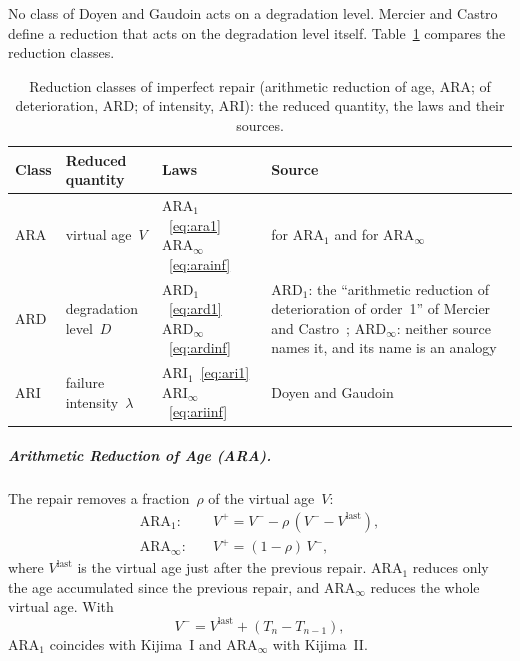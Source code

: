 \documentclass[11pt,a4paper]{article}
\theoremstyle{plain}
\theoremstyle{definition}
\theoremstyle{remark}
\begin{document}
No class of Doyen and Gaudoin acts on a degradation level.
Mercier and Castro~\cite{MercierCastro2019} define a reduction that acts on the degradation level itself.
Table~\ref{tab:reduction_classes} compares the reduction classes.

\begin{table}[htbp]
\centering
\caption{Reduction classes of imperfect repair (arithmetic reduction of age, ARA; of deterioration, ARD; of intensity, ARI): the reduced quantity, the laws and their sources.}
\label{tab:reduction_classes}
\small
\begin{tabularx}{\linewidth}{@{}>{\hsize=0.343\hsize\raggedright\arraybackslash}X>{\hsize=0.943\hsize\raggedright\arraybackslash}X>{\hsize=0.743\hsize\raggedright\arraybackslash}X>{\hsize=1.971\hsize\raggedright\arraybackslash}X@{}}
\toprule
\rowcolor{headgrey}
\textbf{Class} & \textbf{Reduced quantity} & \textbf{Laws} & \textbf{Source} \\
\midrule
ARA
  & virtual age~$V$
  & $\text{ARA}_1$~\eqref{eq:ara1}\newline $\text{ARA}_\infty$~\eqref{eq:arainf}
  & \cite[eq.~(22), p.~12]{DoyenGaudoin2004} for $\text{ARA}_1$ and \cite[eq.~(20), p.~11]{DoyenGaudoin2004} for $\text{ARA}_\infty$ \\[3pt]
ARD
  & degradation level~$D$
  & $\text{ARD}_1$~\eqref{eq:ard1}\newline $\text{ARD}_\infty$~\eqref{eq:ardinf}
  & $\text{ARD}_1$: the ``arithmetic reduction of deterioration of order~1'' of Mercier and Castro~\cite[\S3.1, eq.~(4)]{MercierCastro2019}; $\text{ARD}_\infty$: neither source names it, and its name is an analogy \\[3pt]
ARI
  & failure intensity~$\lambda$
  & $\text{ARI}_1$~\eqref{eq:ari1}\newline $\text{ARI}_\infty$~\eqref{eq:ariinf}
  & Doyen and Gaudoin~\cite{DoyenGaudoin2004} \\
\bottomrule
\end{tabularx}
\end{table}

\subparagraph{Arithmetic Reduction of Age (ARA).}
The repair removes a fraction~$\rho$ of the virtual age~$V$:
\begin{align}
  \text{ARA}_1: &\quad V^+ = V^- - \rho\,(V^- - V^{\mathrm{last}}), \label{eq:ara1} \\
  \text{ARA}_\infty: &\quad V^+ = (1-\rho)\,V^-, \label{eq:arainf}
\end{align}
where $V^{\mathrm{last}}$ is the virtual age just after the previous repair.
$\text{ARA}_1$ reduces only the age accumulated since the previous repair, and $\text{ARA}_\infty$ reduces the whole virtual age.
With
\begin{equation}
  V^- = V^{\mathrm{last}} + (T_n - T_{n-1}),
\end{equation}
$\text{ARA}_1$ coincides with Kijima~I and $\text{ARA}_\infty$ with Kijima~II.
\end{document}
